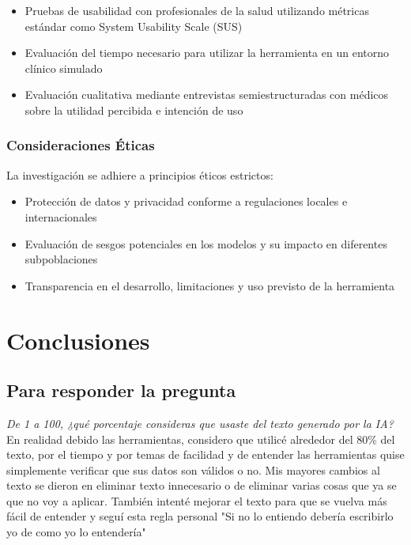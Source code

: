 \documentclass{article}
\begin{document}
\begin{itemize}
\item Pruebas de usabilidad con profesionales de la salud
    utilizando métricas estándar como System Usability Scale
    (SUS) \cite{brooke1996sus}
\item Evaluación del tiempo necesario para utilizar la
    herramienta en un entorno clínico simulado
    \cite{matheny2020artificial}
\item Evaluación cualitativa mediante entrevistas
    semiestructuradas con médicos sobre la utilidad
    percibida e intención de uso \cite{greenhalgh2017beyond}
\end{itemize}
\subsubsection{Consideraciones Éticas}
La investigación se adhiere a principios éticos estrictos:

\begin{itemize}
    \item Protección de datos y privacidad conforme a
        regulaciones locales e internacionales
        \cite{cohen2018hipaa}
    \item Evaluación de sesgos potenciales en los modelos y
        su impacto en diferentes subpoblaciones
        \cite{obermeyer2019dissecting}
    \item Transparencia en el desarrollo, limitaciones y uso
        previsto de la herramienta
        \cite{char2018implementing}
\end{itemize}

\section{Conclusiones}
\subsection{Para responder la pregunta}
\textit{De 1 a 100, ¿qué porcentaje consideras que usaste
del texto generado por la IA?}\\
En realidad debido las herramientas, considero que utilicé
alrededor del 80\% del texto, por el tiempo y por temas de
facilidad y de entender las herramientas quise simplemente
verificar que sus datos son válidos o no. Mis mayores
cambios al texto se dieron en eliminar texto innecesario o
de eliminar varias cosas que ya se que no voy a aplicar.
También intenté mejorar el texto para que se vuelva más
fácil de entender y seguí esta regla personal "Si no lo
entiendo debería escribirlo yo de como yo lo entendería"
\end{document}
